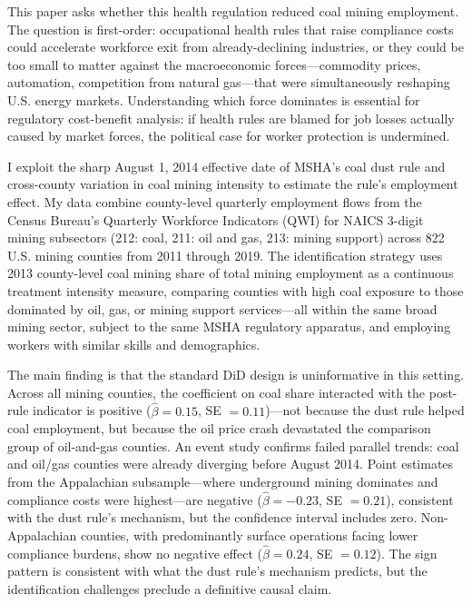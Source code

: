 \documentclass[12pt]{article}
\begin{document}
This paper asks whether this health regulation reduced coal mining employment. The question is first-order: occupational health rules that raise compliance costs could accelerate workforce exit from already-declining industries, or they could be too small to matter against the macroeconomic forces---commodity prices, automation, competition from natural gas---that were simultaneously reshaping U.S. energy markets. Understanding which force dominates is essential for regulatory cost-benefit analysis: if health rules are blamed for job losses actually caused by market forces, the political case for worker protection is undermined.

I exploit the sharp August 1, 2014 effective date of MSHA's coal dust rule and cross-county variation in coal mining intensity to estimate the rule's employment effect. My data combine county-level quarterly employment flows from the Census Bureau's Quarterly Workforce Indicators (QWI) for NAICS 3-digit mining subsectors (212: coal, 211: oil and gas, 213: mining support) across 822 U.S. mining counties from 2011 through 2019. The identification strategy uses 2013 county-level coal mining share of total mining employment as a continuous treatment intensity measure, comparing counties with high coal exposure to those dominated by oil, gas, or mining support services---all within the same broad mining sector, subject to the same MSHA regulatory apparatus, and employing workers with similar skills and demographics.

The main finding is that the standard DiD design is uninformative in this setting. Across all mining counties, the coefficient on coal share interacted with the post-rule indicator is positive ($\hat{\beta} = 0.15$, SE $= 0.11$)---not because the dust rule helped coal employment, but because the oil price crash devastated the comparison group of oil-and-gas counties. An event study confirms failed parallel trends: coal and oil/gas counties were already diverging before August 2014. Point estimates from the Appalachian subsample---where underground mining dominates and compliance costs were highest---are negative ($\hat{\beta} = -0.23$, SE $= 0.21$), consistent with the dust rule's mechanism, but the confidence interval includes zero. Non-Appalachian counties, with predominantly surface operations facing lower compliance burdens, show no negative effect ($\hat{\beta} = 0.24$, SE $= 0.12$). The sign pattern is consistent with what the dust rule's mechanism predicts, but the identification challenges preclude a definitive causal claim.
\end{document}
